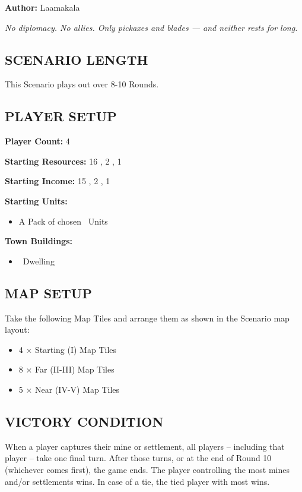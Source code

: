 
\begin{multicols*}{2}

\textbf{Author:} Laamakala

\textit{No diplomacy. No allies. Only pickaxes and blades — and neither rests for long.}

\subsection*{\MakeUppercase{Scenario Length}}
This Scenario plays out over 8-10 Rounds.

\subsection*{\MakeUppercase{Player Setup}}
\textbf{Player Count:} 4

\textbf{Starting Resources:} 16 , 2 , 1 

\textbf{Starting Income:} 15 , 2 , 1 

\textbf{Starting Units:}
\begin{itemize}
  \item A Pack of chosen \bronze\ Units
\end{itemize}

\textbf{Town Buildings:}
\begin{itemize}
  \item \bronze\ Dwelling
\end{itemize}

\subsection*{\MakeUppercase{Map Setup}}
Take the following Map Tiles and arrange them as shown in the Scenario map layout:

\begin{itemize}
  \item 4 × Starting (I) Map Tiles
  \item 8 × Far (II-III) Map Tiles
  \item 5 × Near (IV-V) Map Tiles
\end{itemize}

\subsection*{\MakeUppercase{Victory Condition}}
When a player captures their  mine or settlement, all players -- including that player -- take one final turn. After those turns, or at the end of Round 10 (whichever comes first), the game ends. The player controlling the most mines and/or settlements wins. In case of a tie, the tied player with most  wins.


\end{multicols*}
